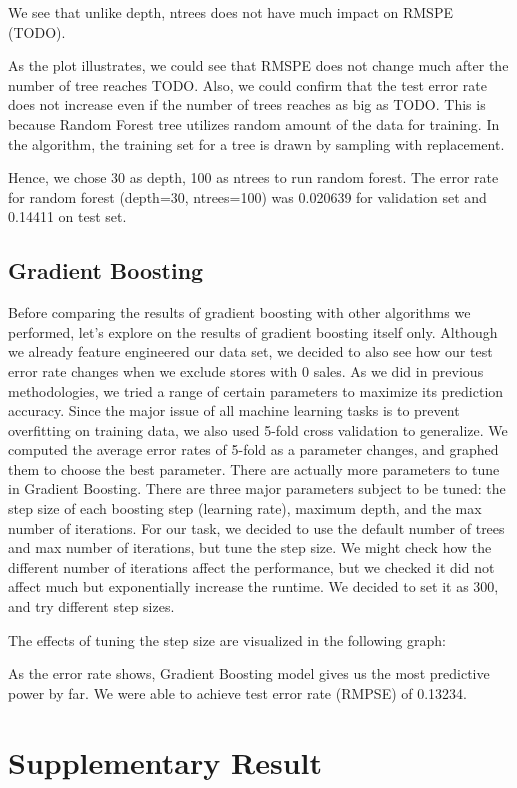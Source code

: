 \documentclass[letterpaper,twocolumn,11pt]{article}
\begin{document}
We see that unlike depth, ntrees does not have much impact on RMSPE (TODO).

As the plot illustrates, we could see that RMSPE does not change much after the number of tree reaches TODO. Also, we could confirm that the test error rate does not increase even if the number of trees reaches as big as TODO. This is because Random Forest tree utilizes random amount of the data for training. In the algorithm, the training set for a tree is drawn by sampling with replacement.

Hence, we chose 30 as depth, 100 as ntrees to run random forest. The error rate for random forest (depth=30, ntrees=100) was 0.020639 for validation set and 0.14411 on test set.

\subsection{Gradient Boosting}
Before comparing the results of gradient boosting with other algorithms we performed, let's explore on the results of gradient boosting itself only. Although we already feature engineered our data set, we decided to also see how our test error rate changes when we exclude stores with 0 sales. As we did in previous methodologies, we tried a range of certain parameters to maximize its prediction accuracy. Since the major issue of all machine learning tasks is to prevent overfitting on training data, we also used 5-fold cross validation to generalize. We computed the average error rates of 5-fold as a parameter changes, and graphed them to choose the best parameter. There are actually more parameters to tune in Gradient Boosting. There are three major parameters subject to be tuned: the step size of each boosting step (learning rate), maximum depth, and the max number of iterations. For our task, we decided to use the default number of trees and max number of iterations, but tune the step size. We might check how the different number of iterations affect the performance, but we checked it did not affect much but exponentially increase the runtime. We decided to set it as 300, and try different step sizes. 

The effects of tuning the step size are visualized in the following graph:


As the error rate shows, Gradient Boosting model gives us the most predictive power by far. We were able to achieve test error rate (RMPSE) of 0.13234.


\section{Supplementary Result}
\end{document}
